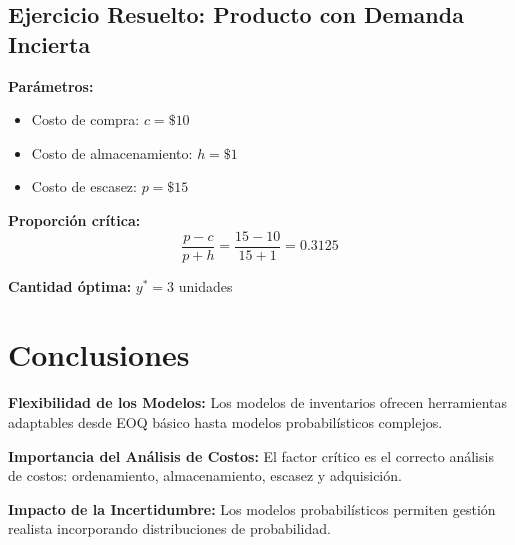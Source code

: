 \documentclass[12pt,a4paper]{book}
\begin{document}
	\subsection{Ejercicio Resuelto: Producto con Demanda Incierta}
	
	\begin{tcolorbox}[enhanced,colback=azulclaro,colframe=azulprincipal,boxrule=2pt,arc=8pt,
		title={\bfseries\color{white} \faCalculator\ CÁLCULO DE PROPORCIÓN CRÍTICA}]
		
		\textbf{Parámetros:}
		\begin{itemize}[leftmargin=*,label=\textcolor{verdeprincipal}{\faArrowRight}]
			\item Costo de compra: $c = \$10$
			\item Costo de almacenamiento: $h = \$1$  
			\item Costo de escasez: $p = \$15$
		\end{itemize}
		
		\textbf{Proporción crítica:}
		\begin{equation}
			\boxed{\frac{p - c}{p + h} = \frac{15 - 10}{15 + 1} = 0.3125}
		\end{equation}
		
		\textbf{Cantidad óptima:} $y^* = 3$ unidades
		
	\end{tcolorbox}
	
	\section{Conclusiones}
	
	\begin{tcolorbox}[enhanced,colback=grisclaro,colframe=grisoScuro,boxrule=3pt,arc=15pt,
		drop shadow,title={\Large\bfseries\color{white} \faFlag\ SÍNTESIS DE APRENDIZAJES}]
		
		\textbf{Flexibilidad de los Modelos:} Los modelos de inventarios ofrecen herramientas adaptables desde EOQ básico hasta modelos probabilísticos complejos.
		
		\textbf{Importancia del Análisis de Costos:} El factor crítico es el correcto análisis de costos: ordenamiento, almacenamiento, escasez y adquisición.
		
		\textbf{Impacto de la Incertidumbre:} Los modelos probabilísticos permiten gestión realista incorporando distribuciones de probabilidad.
		
	\end{tcolorbox}
	
\end{document}
